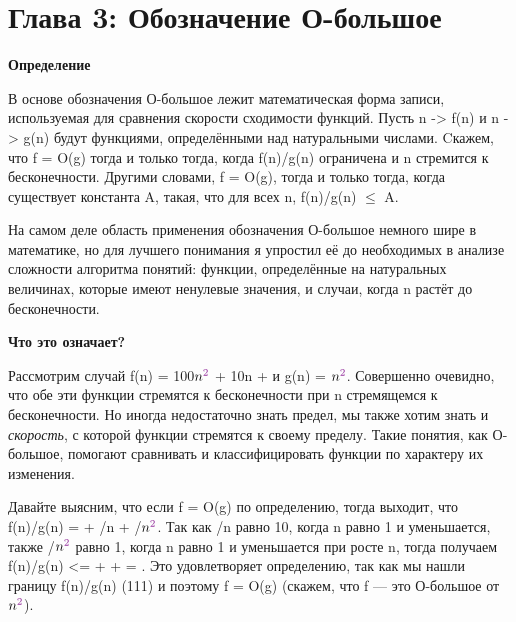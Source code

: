 
\chapter*{Глава 3: Обозначение О-большое}

\vspace{\baselineskip}

\textbf{Определение}

\vspace{\baselineskip}
В основе обозначения О-большое лежит математическая форма записи, используемая для сравнения скорости сходимости функций. Пусть n -> f(n) и n -> g(n) будут функциями, определёнными над натуральными числами. Cкажем, что f = O(g) тогда и только тогда, когда f(n)/g(n) ограничена и n стремится к бесконечности. Другими словами, f = O(g), тогда и только тогда, когда существует  константа A, такая, что для всех n, f(n)/g(n) $\le$ A.

\vspace{\baselineskip}
На самом деле область применения обозначения О-большое немного шире в математике, но для лучшего понимания  я упростил её до необходимых  в анализе сложности алгоритма понятий: функции, определённые на натуральных величинах, которые имеют ненулевые значения, и случаи, когда n растёт до бесконечности.

\vspace{\baselineskip}
\textbf{Что это означает?}

\vspace{\baselineskip}
Рассмотрим случай f(n) = 100$n^{\p{2}}$ + 10n +  и g(n) = $n^{\p{2}}$. Совершенно очевидно, что обе эти функции стремятся к бесконечности при n стремящемся к бесконечности. Но иногда недостаточно знать предел, мы также хотим знать и \textit{скорость}, с которой функции стремятся к своему пределу. Такие понятия, как О-большое, помогают сравнивать и классифицировать функции по характеру их изменения.

\vspace{\baselineskip}
Давайте выясним, что если f = O(g)  по определению, тогда выходит, что f(n)/g(n) =  + /n + /$n^{\p{2}}$. Так как /n равно 10, когда n равно 1 и уменьшается, также /$n^{\p{2}}$ равно 1, когда n равно 1 и уменьшается при росте n, тогда получаем f(n)/g(n) <=  +  +  = . Это удовлетворяет определению,  так как мы нашли границу f(n)/g(n) (111) и поэтому f = O(g) (скажем, что f --- это О-большое от $n^{\p{2}}$). 

